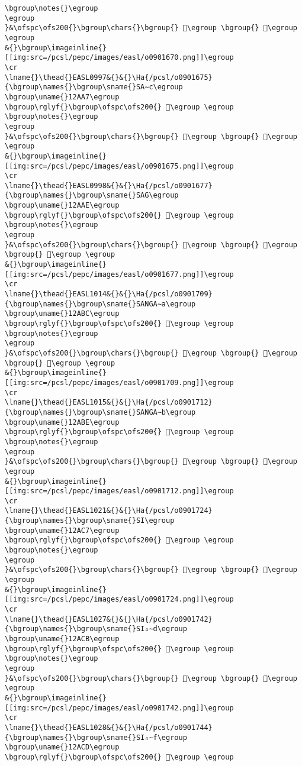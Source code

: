\begin{verbatim}
\bgroup\notes{}\egroup
\egroup
}&\ofspc\ofs200{}\bgroup\chars{}\bgroup{} 𒪣\egroup \bgroup{} 𒪥\egroup \egroup
&{}\bgroup\imageinline{}[[img:src=/pcsl/pepc/images/easl/o0901670.png]]\egroup
\cr
\lname{}\thead{}EASL0997&{}&{}\Ha{/pcsl/o0901675}{\bgroup\names{}\bgroup\sname{}SA∼c\egroup
\bgroup\uname{}12AA7\egroup
\bgroup\rglyf{}\bgroup\ofspc\ofs200{} 𒪧\egroup \egroup
\bgroup\notes{}\egroup
\egroup
}&\ofspc\ofs200{}\bgroup\chars{}\bgroup{} 𒪧\egroup \bgroup{} 𒪨\egroup \egroup
&{}\bgroup\imageinline{}[[img:src=/pcsl/pepc/images/easl/o0901675.png]]\egroup
\cr
\lname{}\thead{}EASL0998&{}&{}\Ha{/pcsl/o0901677}{\bgroup\names{}\bgroup\sname{}SAG\egroup
\bgroup\uname{}12AAE\egroup
\bgroup\rglyf{}\bgroup\ofspc\ofs200{} 𒪮\egroup \egroup
\bgroup\notes{}\egroup
\egroup
}&\ofspc\ofs200{}\bgroup\chars{}\bgroup{} 𒪩\egroup \bgroup{} 𒪮\egroup \bgroup{} 𒪲\egroup \egroup
&{}\bgroup\imageinline{}[[img:src=/pcsl/pepc/images/easl/o0901677.png]]\egroup
\cr
\lname{}\thead{}EASL1014&{}&{}\Ha{/pcsl/o0901709}{\bgroup\names{}\bgroup\sname{}SANGA∼a\egroup
\bgroup\uname{}12ABC\egroup
\bgroup\rglyf{}\bgroup\ofspc\ofs200{} 𒪼\egroup \egroup
\bgroup\notes{}\egroup
\egroup
}&\ofspc\ofs200{}\bgroup\chars{}\bgroup{} 𒪺\egroup \bgroup{} 𒪻\egroup \bgroup{} 𒪼\egroup \egroup
&{}\bgroup\imageinline{}[[img:src=/pcsl/pepc/images/easl/o0901709.png]]\egroup
\cr
\lname{}\thead{}EASL1015&{}&{}\Ha{/pcsl/o0901712}{\bgroup\names{}\bgroup\sname{}SANGA∼b\egroup
\bgroup\uname{}12ABE\egroup
\bgroup\rglyf{}\bgroup\ofspc\ofs200{} 𒪾\egroup \egroup
\bgroup\notes{}\egroup
\egroup
}&\ofspc\ofs200{}\bgroup\chars{}\bgroup{} 𒪽\egroup \bgroup{} 𒪾\egroup \egroup
&{}\bgroup\imageinline{}[[img:src=/pcsl/pepc/images/easl/o0901712.png]]\egroup
\cr
\lname{}\thead{}EASL1021&{}&{}\Ha{/pcsl/o0901724}{\bgroup\names{}\bgroup\sname{}SI\egroup
\bgroup\uname{}12AC7\egroup
\bgroup\rglyf{}\bgroup\ofspc\ofs200{} 𒫇\egroup \egroup
\bgroup\notes{}\egroup
\egroup
}&\ofspc\ofs200{}\bgroup\chars{}\bgroup{} 𒫄\egroup \bgroup{} 𒫇\egroup \egroup
&{}\bgroup\imageinline{}[[img:src=/pcsl/pepc/images/easl/o0901724.png]]\egroup
\cr
\lname{}\thead{}EASL1027&{}&{}\Ha{/pcsl/o0901742}{\bgroup\names{}\bgroup\sname{}SI₄∼d\egroup
\bgroup\uname{}12ACB\egroup
\bgroup\rglyf{}\bgroup\ofspc\ofs200{} 𒫋\egroup \egroup
\bgroup\notes{}\egroup
\egroup
}&\ofspc\ofs200{}\bgroup\chars{}\bgroup{} 𒫋\egroup \bgroup{} 𒫌\egroup \egroup
&{}\bgroup\imageinline{}[[img:src=/pcsl/pepc/images/easl/o0901742.png]]\egroup
\cr
\lname{}\thead{}EASL1028&{}&{}\Ha{/pcsl/o0901744}{\bgroup\names{}\bgroup\sname{}SI₄∼f\egroup
\bgroup\uname{}12ACD\egroup
\bgroup\rglyf{}\bgroup\ofspc\ofs200{} 𒫍\egroup \egroup

\end{verbatim}
